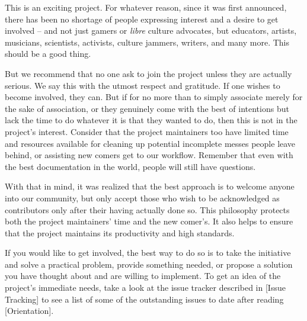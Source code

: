 This is an exciting project. For whatever reason, since it was first announced, there has been no shortage of people expressing interest and a desire to get involved -- and not just gamers or {\it libre} culture advocates, but educators, artists, musicians, scientists, activists, culture jammers, writers, and many more. This should be a good thing. 

But we recommend that no one ask to join the project unless they are actually serious. We say this with the utmost respect and gratitude. If one wishes to become involved, they can. But if for no more than to simply associate merely for the sake of association, or they genuinely come with the best of intentions but lack the time to do whatever it is that they wanted to do, then this is not in the project's interest. Consider that the project maintainers too have limited time and resources available for cleaning up potential incomplete messes people leave behind, or assisting new comers get  to our workflow. Remember that even with the best documentation in the world, people will still have questions.

With that in mind, it was realized that the best approach is to welcome anyone into our community, but only accept those who wish to be acknowledged as contributors only after their having actually done so. This philosophy protects both the project maintainers' time and the new comer's. It also helps to ensure that the project maintains its productivity and high standards. 

If you would like to get involved, the best way to do so is to take the initiative and solve a practical problem, provide something needed, or propose a solution you have thought about and are willing to implement. To get an idea of the project's immediate needs, take a look at the issue tracker described in [Issue Tracking] to see a list of some of the outstanding issues to date after reading [Orientation].

